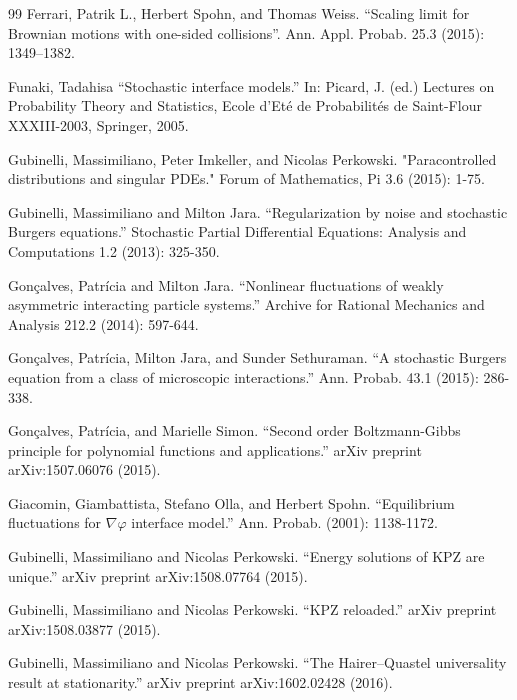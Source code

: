 \documentclass[11pt, a4paper]{article}
\newcommand{\1}{\mathbf{1}}
\begin{document}
\begin{thebibliography}{99}
     Ferrari, Patrik L., Herbert Spohn, and Thomas Weiss. ``Scaling limit for Brownian motions with one-sided collisions''. Ann. Appl. Probab.
 25.3 (2015): 1349--1382.
   
     Funaki, Tadahisa ``Stochastic interface models.'' In: Picard, J. (ed.) Lectures on Probability Theory and Statistics, Ecole d'Et\'e de Probabilit\'es de Saint-Flour XXXIII-2003, Springer, 2005.

    Gubinelli, Massimiliano, Peter Imkeller, and Nicolas Perkowski. "Paracontrolled distributions and singular PDEs." Forum of Mathematics, Pi 3.6 (2015): 1-75.

    Gubinelli, Massimiliano and Milton Jara. ``Regularization by noise and
    stochastic Burgers equations.'' Stochastic Partial Differential Equations:
    Analysis and Computations 1.2 (2013): 325-350.

     Gon\c calves, Patr\'icia and Milton Jara. ``Nonlinear fluctuations of weakly
     asymmetric interacting particle systems.'' Archive for Rational Mechanics
     and Analysis 212.2 (2014): 597-644.
     
     Gon\c calves, Patr\'icia, Milton Jara, and Sunder Sethuraman. ``A stochastic Burgers equation from a class of microscopic interactions.'' Ann. Probab. 43.1 (2015): 286-338.
     
    Gon\c calves, Patr\'icia, and Marielle Simon. ``Second order Boltzmann-Gibbs principle for polynomial functions and applications.'' arXiv preprint arXiv:1507.06076 (2015).

    Giacomin, Giambattista, Stefano Olla, and Herbert Spohn. ``Equilibrium fluctuations for $\nabla \varphi$ interface model.'' Ann. Probab. (2001): 1138-1172.

    Gubinelli, Massimiliano and Nicolas Perkowski. ``Energy solutions of KPZ are unique.'' arXiv preprint arXiv:1508.07764 (2015).
    
    Gubinelli, Massimiliano and Nicolas Perkowski. ``KPZ reloaded.'' arXiv preprint arXiv:1508.03877 (2015).
    
    Gubinelli, Massimiliano and Nicolas Perkowski. ``The Hairer--Quastel universality result at stationarity.'' arXiv preprint arXiv:1602.02428 (2016).
    

\end{thebibliography}
\end{document}
